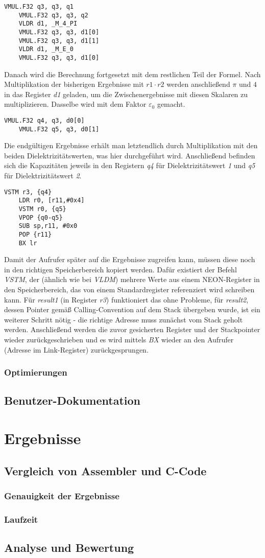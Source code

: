 \documentclass[11pt]{scrartcl}
\begin{document}
\begin{lstlisting}[language={[x86masm]Assembler}]
	VMUL.F32 q3, q3, q1
	VMUL.F32 q3, q3, q2
	VLDR d1, _M_4_PI
	VMUL.F32 q3, q3, d1[0]
	VMUL.F32 q3, q3, d1[1]
	VLDR d1, _M_E_0
	VMUL.F32 q3, q3, d1[0]
\end{lstlisting}
Danach wird die Berechnung fortgesetzt mit dem restlichen Teil der Formel. Nach Multiplikation der bisherigen Ergebnisse mit $r1 \cdot r2$ werden anschließend $\pi$ und $4$ in das Register \emph{d1} geladen, um die Zwischenergebnisse mit diesen Skalaren zu multiplizieren. Dasselbe wird mit dem Faktor $\varepsilon_{0}$ gemacht.
\begin{lstlisting}[language={[x86masm]Assembler}]
	VMUL.F32 q4, q3, d0[0]
	VMUL.F32 q5, q3, d0[1]
\end{lstlisting}
Die endgültigen Ergebnisse erhält man letztendlich durch Multiplikation mit den beiden Dielektrizitätswerten, was hier durchgeführt wird. Anschließend befinden sich die Kapazitäten jeweils in den Registern \emph{q4} für Dielektrizitätswert \emph{1} und \emph{q5} für Dielektrizitätswert \emph{2}.
\begin{lstlisting}[language={[x86masm]Assembler}]
	VSTM r3, {q4}
	LDR r0, [r11,#0x4]
	VSTM r0, {q5}
	VPOP {q0-q5}
	SUB sp,r11, #0x0
	POP {r11}
	BX lr
\end{lstlisting}
Damit der Aufrufer später auf die Ergebnisse zugreifen kann, müssen diese noch in den richtigen Speicherbereich kopiert werden. Dafür existiert der Befehl \emph{VSTM}, der (ähnlich wie bei \emph{VLDM}) mehrere Werte aus einem NEON-Register in den Speicherbereich, das von einem Standardregister referenziert wird schreiben kann. Für \emph{result1} (in Register \emph{r3}) funktioniert das ohne Probleme, für \emph{result2}, dessen Pointer gemäß Calling-Convention auf dem Stack übergeben wurde, ist ein weiterer Schritt nötig - die richtige Adresse muss zunächst vom Stack geholt werden. Anschließend werden die zuvor gesicherten Register und der Stackpointer wieder zurückgeschrieben und es wird mittels \emph{BX} wieder an den Aufrufer (Adresse im Link-Register) zurückgesprungen.
\subsubsection{Optimierungen}
\subsection{Benutzer-Dokumentation}
\section{Ergebnisse}
\subsection{Vergleich von Assembler und C-Code}
\subsubsection{Genauigkeit der Ergebnisse}
\subsubsection{Laufzeit}
\subsection{Analyse und Bewertung}
\end{document}
